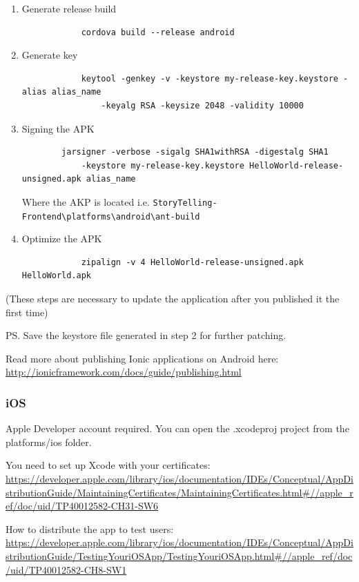 \begin{appendices}
\begin{enumerate}
	\item Generate release build
		\begin{verbatim}
  			cordova build --release android
  		\end{verbatim}
	\item Generate key
		\begin{verbatim}
  			keytool -genkey -v -keystore my-release-key.keystore -alias alias_name 
  				-keyalg RSA -keysize 2048 -validity 10000
  		\end{verbatim}
	\item Signing the APK
		\begin{verbatim}
  		jarsigner -verbose -sigalg SHA1withRSA -digestalg SHA1 
  			-keystore my-release-key.keystore HelloWorld-release-unsigned.apk alias_name
  		\end{verbatim}
    Where the AKP is located i.e. \verb|StoryTelling-Frontend\platforms\android\ant-build|
	\item Optimize the APK
		\begin{verbatim}
  			zipalign -v 4 HelloWorld-release-unsigned.apk HelloWorld.apk
  		\end{verbatim} 
  \end{enumerate} 

(These steps are necessary to update the application after you published it the first time) 

PS. Save the keystore file generated in step 2 for further patching.

Read more about publishing Ionic applications on Android here: \url{http://ionicframework.com/docs/guide/publishing.html}

\subsubsection{iOS}
Apple Developer account required. You can open the .xcodeproj project from the platforms/ios folder.\newline 

You need to set up Xcode with your certificates: 
\url{https://developer.apple.com/library/ios/documentation/IDEs/Conceptual/AppDistributionGuide/MaintainingCertificates/MaintainingCertificates.html#//apple_ref/doc/uid/TP40012582-CH31-SW6}\newline

How to distribute the app to test users:
\url{https://developer.apple.com/library/ios/documentation/IDEs/Conceptual/AppDistributionGuide/TestingYouriOSApp/TestingYouriOSApp.html#//apple_ref/doc/uid/TP40012582-CH8-SW1}


\end{appendices}

